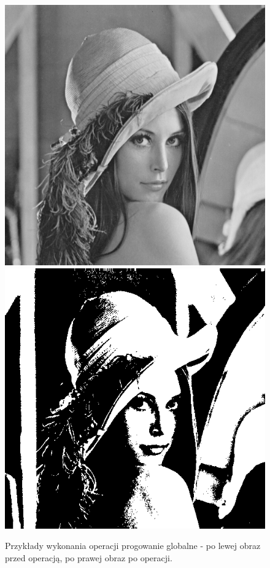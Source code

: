 \documentclass{article}
\begin{document}
\begin{figure}[!htb]
\includegraphics[scale=0.2]{img/lena_8bit.png} 
\includegraphics[scale=0.2]{img/Progowanie_Globalne_lena_8bit.png} 
\caption{Przykłady wykonania operacji progowanie globalne - po lewej obraz przed operacją, po prawej obraz po operacji. }
\end{figure}
\end{document}
